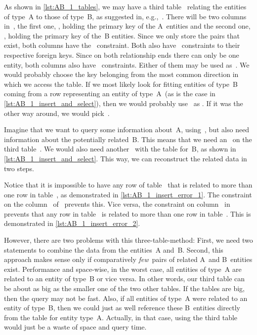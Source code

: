 As shown in \cref{lst:AB_1_tables}, we may have a third table~ relating the entities of type~A to those of type~B, as suggested in, e.g.,~\cite{S2024D:MEDTRDM}.
There will be two columns in~, the first one, , holding the primary key of the A~entities and the second one, , holding the primary key of the~B entities.
Since we only store the pairs that exist, both columns have the~ constraint.
Both also have~ constraints to their respective foreign keys.
Since on both relationship ends there can only be one entity, both columns also have ~constraints.
Either of them may be used as~.
We would probably choose the key belonging from the most common direction in which we access the table.
If we most likely look for fitting entities of type~B coming from a row representing an entity of type~A~(as is the case in \cref{lst:AB_1_insert_and_select}), then we would probably use~ as .
If it was the other way around, we would pick~.

Imagine that we want to query some information about~A, using~, but also need information about the potentially related~B.
This means that we need an~ on the third table~.
We would also need another~ with the table for~B, as shown in \cref{lst:AB_1_insert_and_select}.
This way, we can reconstruct the related data in two steps.

Notice that it is impossible to have any row of table~ that is related to more than one row in table~, as demonstrated in \cref{lst:AB_1_insert_error_1}.
The  constraint on the column~ of~ prevents this.
Vice versa, the  constraint on column~ in~ prevents that any row in table~ is related to more than one row in table~.
This is demonstrated in \cref{lst:AB_1_insert_error_2}.

However, there are two problems with this three-table-method:
First, we need two  statements to combine the data from the entities~A and~B.
Second, this approach makes sense only if comparatively \emph{few}~pairs of related A~and B~entities exist.
Performance and space-wise, in the worst case, all entities of type~A are related to an entity of type~B or vice versa.
In other words, our third table can be about as big as the smaller one of the two other tables.
If the tables are big, then the query may not be fast.
Also, if all entities of type~A were related to an entity of type~B, then we could just as well reference these B~entities directly from the table for entity type~A.
Actually, in that case, using the third table would just be a waste of space and query time.

